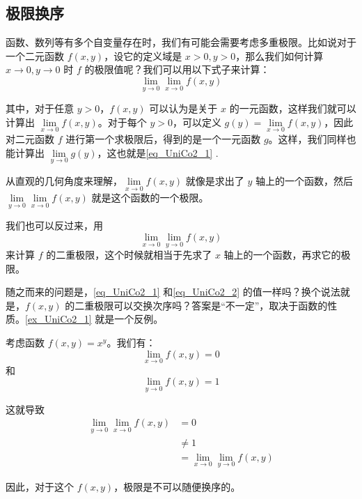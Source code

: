 

\subsection{极限换序}

函数、数列等有多个自变量存在时，我们有可能会需要考虑多重极限。比如说对于一个二元函数 $f(x, y)$，设它的定义域是 $x>0, y>0$，那么我们如何计算 $x\to 0, y\to 0$ 时 $f$ 的极限值呢？我们可以用以下式子来计算：
\begin{equation}\label{eq_UniCo2_1}
\lim\limits_{y\to 0}\lim\limits_{x\to 0}f(x, y)
\end{equation}

其中，对于任意 $y>0$，$f(x, y)$ 可以认为是关于 $x$ 的一元函数，这样我们就可以计算出 $\lim\limits_{x\to 0}f(x, y)$。对于每个 $y>0$，可以定义 $g(y)=\lim\limits_{x\to 0}f(x, y)$，因此对二元函数 $f$ 进行第一个求极限后，得到的是一个一元函数 $g$。这样，我们同样也能计算出 $\lim\limits_{y\to 0}g(y)$，这也就是\autoref{eq_UniCo2_1} .

从直观的几何角度来理解，$\lim\limits_{x\to 0}f(x, y)$ 就像是求出了 $y$ 轴上的一个函数，然后 $\lim\limits_{y\to 0}\lim\limits_{x\to 0}f(x, y)$ 就是这个函数的一个极限。

我们也可以反过来，用
\begin{equation}\label{eq_UniCo2_2}
\lim\limits_{x\to 0}\lim\limits_{y\to 0}f(x, y)
\end{equation}
来计算 $f$ 的二重极限，这个时候就相当于先求了 $x$ 轴上的一个函数，再求它的极限。

随之而来的问题是，\autoref{eq_UniCo2_1} 和\autoref{eq_UniCo2_2} 的值一样吗？换个说法就是，$f(x, y)$ 的二重极限可以交换次序吗？答案是“不一定”，取决于函数的性质。\autoref{ex_UniCo2_1} 就是一个反例。

\begin{example}{}\label{ex_UniCo2_1}
考虑函数 $f(x, y)=x^y$。我们有：
\begin{equation}
\lim\limits_{x\to 0}f(x, y)=0
\end{equation}
和
\begin{equation}
\lim\limits_{y\to 0}f(x, y)=1
\end{equation}

这就导致
\begin{equation}
\begin{aligned}
\lim\limits_{y\to 0}\lim\limits_{x\to 0}f(x, y)&=0\\
&\not = 1\\
&=\lim\limits_{x\to 0}\lim\limits_{y\to 0}f(x, y)
\end{aligned}
\end{equation}

因此，对于这个 $f(x, y)$，极限是不可以随便换序的。

\end{example}



